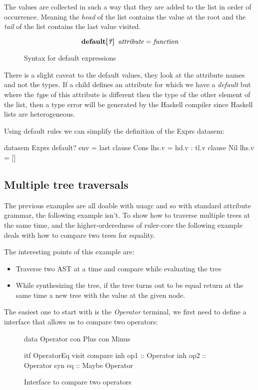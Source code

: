 The values are collected in such a way that they are added to the list in order of occurrence. Meaning the \emph{head} of the list contains the value at the root and the \emph{tail} of the list contains the last value visited. 

\begin{figure}[h!]
\[
\textbf{default[\textit{?}]} \hspace{5pt} \emph{attribute} = \emph{function}
\]
\caption{Syntax for default expressions}
\label{default:syntax}
\end{figure}

There is a slight caveat to the default values, they look at the attribute names and not the types. If a child defines an attribute for which we have a \emph{default} but where the \emph{type} of this attribute is different then the type of the other element of the list, then a type error will be generated by the Haskell compiler since Haskell lists are heterogeneous.

Using default rules we can simplify the definition of the Exprs datasem:

\begin{code}
datasem Exprs
   default? env = last
   clause Cons
     lhs.v = hd.v : tl.v
   clause Nil
     lhs.v = []
\end{code}

\subsection{Multiple tree traversals}
The previous examples are all doable with uuagc and so with standard attribute grammar, the following example isn't. To show how to traverse multiple trees at the same time, and the higher-orderedness of ruler-core the following example deals with how to compare two trees for equality.

The interesting points of this example are:
\begin{itemize}
\item Traverse two AST at a time and compare while evaluating the tree
\item While synthesizing the tree, if the tree turns out to be equal return at the same time a new tree with the value at the given node.
\end{itemize}

The easiest one to start with is the \emph{Operator} terminal, we first need to define a interface that allows us to compare two operators:

\begin{figure}[H]
\begin{minipage}[t]{0.3\linewidth}
\begin{code}
data Operator
  con Plus
  con Minus
\end{code}
\end{minipage}
\begin{minipage}[t]{0.7\linewidth}
\begin{code}
itf OperatorEq
  visit compare
    inh op1 :: Operator
    inh op2 :: Operator
    syn eq  :: Maybe Operator
\end{code}
\end{minipage}
\caption{Interface to compare two operators}
\end{figure}

